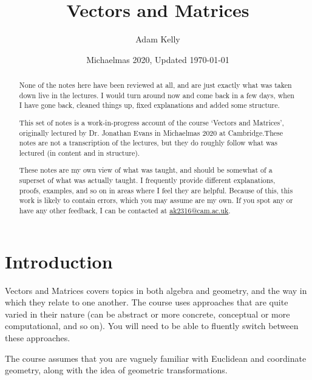 \documentclass[a4]{scrartcl}
\title{Vectors and Matrices}
\author{Adam Kelly}
\date{Michaelmas 2020, Updated \today}
\begin{document}
\maketitle

\begin{abstract}\vspace{2\baselineskip}
	{\color{red} None of the notes here have been reviewed at all, and are just exactly what was taken down live in the lectures. I would turn around now and come back in a few days, when I have gone back, cleaned things up, fixed explanations and added some structure.}
	\vspace{5\baselineskip}



	This set of notes is a work-in-progress account of the course `Vectors and Matrices', originally lectured by Dr. Jonathan Evans in Michaelmas 2020 at Cambridge.These notes are not a transcription of the lectures, but they do roughly follow what was lectured (in content and in structure).

	These notes are my own view of what was taught, and should be somewhat of a superset of what was actually taught. I frequently provide different explanations, proofs, examples, and so on in areas where I feel they are helpful. Because of this, this work is likely to contain errors, which you may assume are my own. If you spot any or have any other feedback, I can be contacted at \href{mailto:ak2316@cam.ac.uk}{ak2316@cam.ac.uk}.

\end{abstract}

\tableofcontents

\clearpage

\section{Introduction}

Vectors and Matrices covers topics in both algebra and geometry, and the way in which they relate to one another. The course uses approaches that are quite varied in their nature (can be abstract or more concrete, conceptual or more computational, and so on). You will need to be able to fluently switch between these approaches.

The course assumes that you are vaguely familiar with Euclidean and coordinate geometry, along with the idea of geometric transformations.
\end{document}
